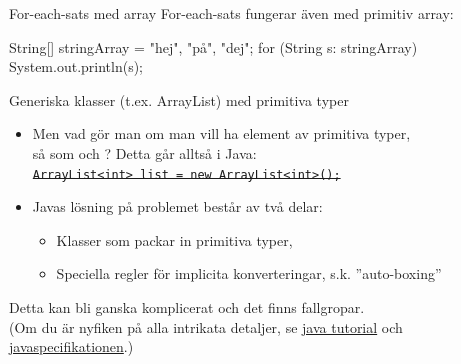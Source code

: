 \begin{Slide}{For-each-sats med array}
For-each-sats fungerar även med primitiv array:
\begin{Code}[numberstyle=,language=Java]
        String[] stringArray = {"hej", "på", "dej"};
        for (String s: stringArray){
            System.out.println(s);
        }
\end{Code}
\end{Slide}


\begin{Slide}{Generiska klasser (t.ex. ArrayList) med primitiva typer}
\begin{itemize}\footnotesize
\item Men vad gör man om man vill ha element av primitiva typer, \\ så som  och ? 
Detta går alltså  i Java: \\
\sout{\texttt{ArrayList<int> list = new ArrayList<int>();}}

\vspace{2em}
\item Javas lösning på problemet består av två delar:
\begin{itemize}\footnotesize
\item Klasser som packar in primitiva typer, 
\item Speciella regler för implicita konverteringar, s.k. ''auto-boxing'' 
\end{itemize}
\end{itemize}
\scriptsize\vspace{1em}
Detta kan bli ganska komplicerat och det finns fallgropar.\\
(Om du är nyfiken på alla intrikata detaljer, se
\href{https://docs.oracle.com/javase/tutorial/java/data/autoboxing.html}{java tutorial} och   \href{https://docs.oracle.com/javase/specs/jls/se8/html/jls-5.html#jls-5.1.7}{javaspecifikationen}.)
\end{Slide}

